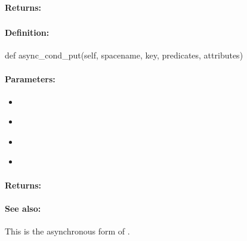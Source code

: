 \paragraph{Returns:}


\pagebreak
\subsubsection{}
\label{api:python:async_cond_put}


\paragraph{Definition:}
\begin{pythoncode}
def async_cond_put(self, spacename, key, predicates, attributes)
\end{pythoncode}

\paragraph{Parameters:}
\begin{itemize}[noitemsep]
\item {}\\

\item {}\\

\item {}\\

\item {}\\

\end{itemize}

\paragraph{Returns:}


\paragraph{See also:}  This is the asynchronous form of .

